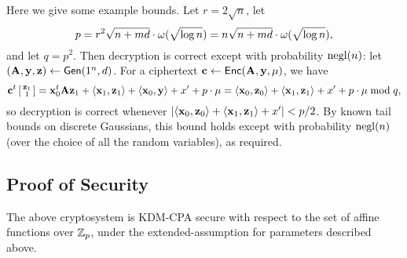 Here we give some example bounds.  Let $r=2\sqrt{n}$, let \[ p = r^{2}
\sqrt{n + md} \cdot \omega(\sqrt{\log n}) = n\sqrt{n + md} \cdot \omega(\sqrt{\log n}), \] and let
$q=p^2$.  Then decryption is correct except with probability
$\operatorname{negl}(n)$: let $(\mathbf{A}, \mathbf{y}, \mathbf{z}) \gets \mathsf{Gen}(1^n, d)$.  For a
ciphertext $\mathbf{c} \gets \mathsf{Enc}(\mathbf{A}, \mathbf{y}, \mu)$, we have
\[ \mathbf{c}^t \left[
  \begin{smallmatrix}
    \mathbf{z}_{1} \\ 1
  \end{smallmatrix} \right] = \mathbf{x}_{0}^t\mathbf{A}\mathbf{z}_{1} +
\langle{\ensuremath{\mathbf{x}}_{1},\ensuremath{\mathbf{z}}_{1}}\rangle + \langle{\ensuremath{\mathbf{x}}_{0},\ensuremath{\mathbf{y}}}\rangle + x' + p\cdot\mu
= \langle{\ensuremath{\mathbf{x}}_{0}, \ensuremath{\mathbf{z}}_{0}}\rangle + \langle{\ensuremath{\mathbf{x}}_{1},\ensuremath{\mathbf{z}}_{1}}\rangle + x' +
p\cdot\mu \bmod q,\] so decryption is correct whenever
$\lvert{\langle{\ensuremath{\mathbf{x}}_{0},\ensuremath{\mathbf{z}}_{0}}\rangle+\langle{\ensuremath{\mathbf{x}}_{1},\ensuremath{\mathbf{z}}_{1}}\rangle + x'}\rvert <
p/2$.  By known tail bounds on discrete Gaussians, this bound holds
except with probability $\operatorname{negl}(n)$ (over the choice of all the random
variables), as required.

\subsection{Proof of Security}

\begin{theorem}
  \label{thm:KDMCPATheorem}
  The above cryptosystem is KDM-CPA secure with respect to the set of
  affine functions over $\mathbb{Z}_p$, under the extended-\lwe assumption for
  parameters described above.
\end{theorem}


